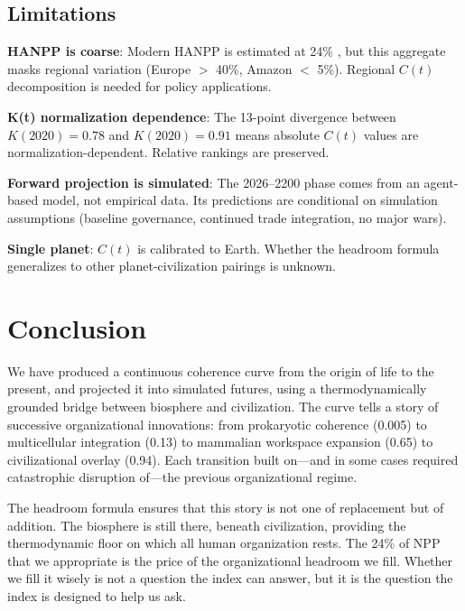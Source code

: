 \documentclass[10pt,letterpaper]{article}
\newcommand{\ct}{$C(t)$}
\begin{document}
\subsection*{Limitations}

\textbf{HANPP is coarse}: Modern HANPP is estimated at 24\%
\cite{haberl2007}, but this aggregate masks regional variation
(Europe $>$ 40\%, Amazon $<$ 5\%). Regional \ct{} decomposition
is needed for policy applications.

\textbf{K(t) normalization dependence}: The 13-point divergence between
$K(2020) = 0.78$ and $K(2020) = 0.91$ means absolute \ct{} values are
normalization-dependent. Relative rankings are preserved.

\textbf{Forward projection is simulated}: The 2026--2200 phase comes
from an agent-based model, not empirical data. Its predictions are
conditional on simulation assumptions (baseline governance, continued
trade integration, no major wars).

\textbf{Single planet}: \ct{} is calibrated to Earth. Whether the
headroom formula generalizes to other planet-civilization pairings
is unknown.

\section*{Conclusion}

We have produced a continuous coherence curve from the origin of life
to the present, and projected it into simulated futures, using a
thermodynamically grounded bridge between biosphere and civilization.
The curve tells a story of successive organizational innovations: from
prokaryotic coherence (0.005) to multicellular integration (0.13) to
mammalian workspace expansion (0.65) to civilizational overlay (0.94).
Each transition built on---and in some cases required catastrophic
disruption of---the previous organizational regime.

The headroom formula ensures that this story is not one of replacement
but of addition. The biosphere is still there, beneath civilization,
providing the thermodynamic floor on which all human organization rests.
The 24\% of NPP that we appropriate is the price of the organizational
headroom we fill. Whether we fill it wisely is not a question the index
can answer, but it is the question the index is designed to help us ask.
\end{document}
